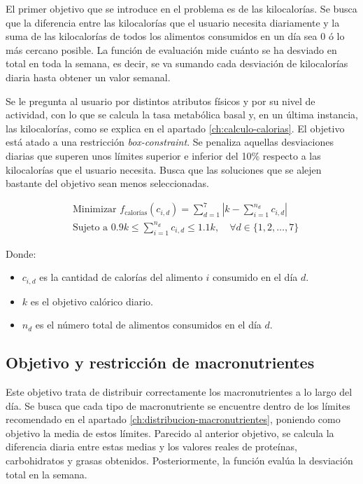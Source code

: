 El primer objetivo que se introduce en el problema es de las kilocalorías. Se busca que la diferencia entre las kilocalorías que el usuario necesita diariamente y la suma de las kilocalorías de todos los alimentos consumidos en un día sea 0 ó lo más cercano posible. La función de evaluación mide cuánto se ha desviado en total en toda la semana, es decir, se va sumando cada desviación de kilocalorías diaria hasta obtener un valor semanal.

Se le pregunta al usuario por distintos atributos físicos y por su nivel de actividad, con lo que se calcula la tasa metabólica basal y, en un última instancia, las kilocalorías, como se explica en el apartado \ref{ch:calculo-calorias}.
\newpage
El objetivo está atado a una restricción \textit{box-constraint}. Se penaliza aquellas desviaciones diarias que superen unos límites superior e inferior del 10\% respecto a las kilocalorías que el usuario necesita. Busca que las soluciones que se alejen bastante del objetivo sean menos seleccionadas.
\begin{small}
\[
    \begin{aligned}
    & \text{Minimizar } f_{\text{calorías}}(c_{i,d}) = \sum_{d=1}^{7} \left| k - \sum_{i=1}^{n_d} c_{i,d} \right| \\
    & \text{Sujeto a } 0.9k \leq \sum_{i=1}^{n_d} c_{i,d} \leq 1.1k, \quad \forall d \in \{1, 2, \ldots, 7\}
    \end{aligned}
    \]

        Donde:
        \begin{itemize}
        \item \( c_{i,d} \) es la cantidad de calorías del alimento \( i \) consumido en el día \( d \).
        \item \( k \) es el objetivo calórico diario.
        \item \( n_d \) es el número total de alimentos consumidos en el día \( d \).
        \end{itemize}
\end{small}


\subsection{Objetivo y restricción de macronutrientes}
\label{ch:objetivo-restriccion-macronutrientes}

Este objetivo trata de distribuir correctamente los macronutrientes a lo largo del día. Se busca que cada tipo de macronutriente se encuentre dentro de los límites recomendado en el apartado \ref{ch:distribucion-macronutrientes}, poniendo como objetivo la media de estos límites. Parecido al anterior objetivo, se calcula la diferencia diaria entre estas medias y los valores reales de proteínas, carbohidratos y grasas obtenidos. Posteriormente, la función evalúa la desviación total en la semana.

